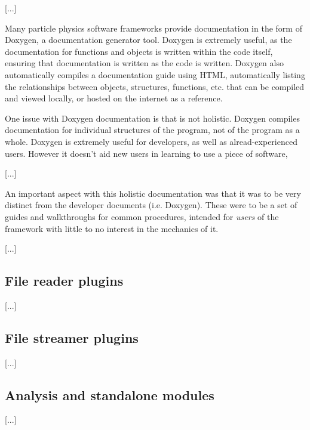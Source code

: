 [...]

Many particle physics software frameworks provide documentation in the form of Doxygen, a documentation generator tool. Doxygen is extremely useful, as the documentation for functions and objects is written within the code itself, ensuring that documentation is written as the code is written. Doxygen also automatically compiles a documentation guide using HTML, automatically listing the relationships between objects, structures, functions, etc. that can be compiled and viewed locally, or hosted on the internet as a reference.

One issue with Doxygen documentation is that is not holistic. Doxygen compiles documentation for individual structures of the program, not of the program as a whole. Doxygen is extremely useful for developers, as well as alread-experienced users. However it doesn't aid new users in learning to use   a piece of software, 

[...]

An important aspect with this holistic documentation was that it was to be very distinct from the developer documents (i.e. Doxygen). These were to be a set of guides and walkthroughs for common procedures, intended for \emph{users} of the framework with little to no interest in the mechanics of it.

[...]

\subsection{File reader plugins}
[...]

\subsection{File streamer plugins}
[...]

\subsection{Analysis and standalone modules}
[...]
